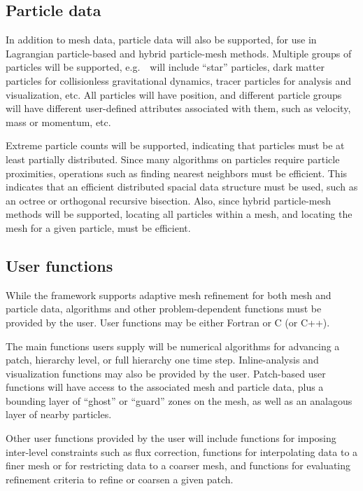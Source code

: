 \documentclass[10pt,twocolumn]{article}
\begin{document}
\subsection{Particle data} \label{ss:require-particles}

In addition to mesh data, particle data will also be supported, for
use in Lagrangian particle-based and hybrid particle-mesh methods.
Multiple groups of particles will be supported, e.g.~\enzoii\ will
include ``star'' particles, dark matter particles for collisionless
gravitational dynamics, tracer particles for analysis and
visualization, etc.  All particles will have position, and different particle
groups will have different user-defined attributes associated with them, such
as velocity, mass or momentum, etc.

Extreme particle counts will be supported, indicating that particles
must be at least partially distributed.  Since many algorithms on
particles require particle proximities, operations such as finding
nearest neighbors must be efficient.  This indicates that an efficient
distributed spacial data structure must be used, such as an octree or
orthogonal recursive bisection.  Also, since hybrid particle-mesh
methods will be supported, locating all particles within a mesh, and
locating the mesh for a given particle, must be efficient.


\subsection{User functions} \label{ss:require-user}

While the framework supports adaptive mesh refinement for both mesh
and particle data, algorithms and other problem-dependent functions
must be provided by the user.  User functions may be either Fortran or
C (or C++).  

The main functions users supply will be numerical algorithms for
advancing a patch, hierarchy level, or full hierarchy one time step.
Inline-analysis and visualization functions may also be provided by
the user.  Patch-based user functions will have access to the
associated mesh and particle data, plus a bounding layer of ``ghost''
or ``guard'' zones on the mesh, as well as an analagous layer of
nearby particles.

Other user functions provided by the user will include functions for
imposing inter-level constraints such as flux correction, functions
for interpolating data to a finer mesh or for restricting data to a
coarser mesh, and functions for evaluating refinement criteria to
refine or coarsen a given patch.
\end{document}

